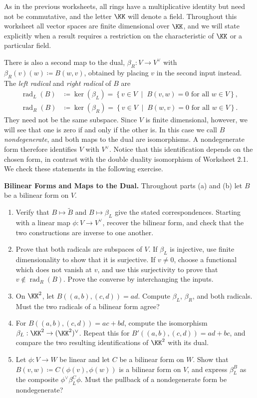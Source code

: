 \documentclass[12pt,reqno]{amsart}
\DeclareMathOperator{\rad}{rad}
\begin{document}
As in the previous worksheets, all rings have a multiplicative identity but need not be commutative, and the letter $\KK$ will denote a field. Throughout this worksheet all vector spaces are finite dimensional over $\KK$, and we will state explicitly when a result requires a restriction on the characteristic of $\KK$ or a particular field.

There is also a second map to the dual, $\beta_R:V\to V^{\vee}$ with $\beta_R(v)(w)\coloneqq B(w,v)$, obtained by placing $v$ in the second input instead. The \emph{left radical} and \emph{right radical} of $B$ are
\[
\begin{aligned}
\rad_L(B)&\coloneqq\ker(\beta_L)=\left\{v\in V \;\; \big| \;\; B(v,w)=0\text{ for all }w\in V\right\},\\
\rad_R(B)&\coloneqq\ker(\beta_R)=\left\{v\in V \;\; \big| \;\; B(w,v)=0\text{ for all }w\in V\right\}.
\end{aligned}
\]
They need not be the same subspace. Since $V$ is finite dimensional, however, we will see that one is zero if and only if the other is. In this case we call $B$ \emph{nondegenerate}, and both maps to the dual are isomorphisms. A nondegenerate form therefore identifies $V$ with $V^{\vee}$. Notice that this identification depends on the chosen form, in contrast with the double duality isomorphism of Worksheet 2.1. We check these statements in the following exercise.

\hrulefill

\begin{problems}
\item\label{b:maps} \textbf{Bilinear Forms and Maps to the Dual.} Throughout parts (a) and (b) let $B$ be a bilinear form on $V$.
\begin{enumerate}
\item Verify that $B\mapsto\widetilde B$ and $B\mapsto\beta_L$ give the stated correspondences. Starting with a linear map $\phi:V\to V^{\vee}$, recover the bilinear form, and check that the two constructions are inverse to one another.
\item Prove that both radicals are subspaces of $V$. If $\beta_L$ is injective, use finite dimensionality to show that it is surjective. If $v\ne0$, choose a functional which does not vanish at $v$, and use this surjectivity to prove that $v\notin\rad_R(B)$. Prove the converse by interchanging the inputs.
\item On $\KK^2$, let $B((a,b),(c,d))=ad$. Compute $\beta_L$, $\beta_R$, and both radicals. Must the two radicals of a bilinear form agree?
\item For $B((a,b),(c,d))=ac+bd$, compute the isomorphism $\beta_L:\KK^2\to(\KK^2)^{\vee}$. Repeat this for $B'((a,b),(c,d))=ad+bc$, and compare the two resulting identifications of $\KK^2$ with its dual.
\item Let $\phi:V\to W$ be linear and let $C$ be a bilinear form on $W$. Show that $B(v,w)\coloneqq C(\phi(v),\phi(w))$ is a bilinear form on $V$, and express $\beta_L^B$ as the composite $\phi^{\vee}\beta_L^C\phi$. Must the pullback of a nondegenerate form be nondegenerate?
\end{enumerate}
\end{problems}
\end{document}
